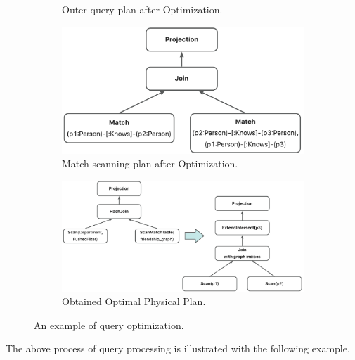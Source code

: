 {\begin{figure}
\begin{subfigure}[b]{0.4\linewidth}
        \caption{Outer query plan after Optimization.}
        \label{fig:relational-plan-optimized}
    \end{subfigure}
    \begin{subfigure}[b]{0.4\linewidth}
        \centering
        \includegraphics[width=\linewidth]{./figures/converged-logical-plan-graph-optimized.png}
        \caption{Match scanning plan after Optimization.}
        \label{fig:graph-plan-optimized}
    \end{subfigure}
    \begin{subfigure}[b]{0.5\linewidth}
        \centering
        \includegraphics[width=\linewidth]{./figures/converged-physical-plan.png}
        \caption{Obtained Optimal Physical Plan.}
        \label{fig:physical-plan-optimized}
    \end{subfigure}
    \caption{An example of query optimization.}
    \label{fig:query-grtree-example}
\end{figure}



The above process of query processing is illustrated with the following example.

}
